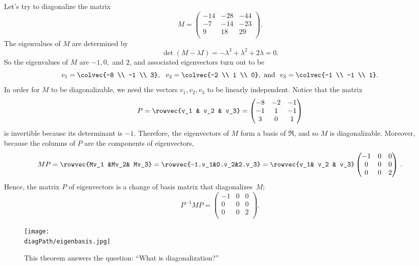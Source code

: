 \begin{example}
Let's try to diagonalize the matrix
\[M=\begin{pmatrix}
-14 & -28 & -44 \\
-7 & -14 & -23 \\
9 & 18 & 29 \\
\end{pmatrix}.\]
The eigenvalues of \(M\) are determined by \[\det(M-\lambda I)=-\lambda^3+\lambda^2+2\lambda=0.\]
So the eigenvalues of \(M\) are \(-1,0,\) and \(2\), and associated eigenvectors turn out to be 
\[
v_1=\colvec{-8 \\ -1 \\ 3},~~ v_2=\colvec{-2 \\ 1 \\ 0}, {\rm ~and~~} v_3=\colvec{-1 \\ -1 \\ 1}.
\] 
In order for \(M\) to be diagonalizable, we need the vectors \(v_1, v_2, v_3\) to be linearly independent. Notice that the matrix
\[P=\rowvec{v_1 & v_2 & v_3}=\begin{pmatrix}
-8 & -2 & -1 \\
-1 & 1 & -1 \\
3 & 0 & 1 \\
\end{pmatrix}\]
is invertible because its determinant is \(-1\). Therefore, the eigenvectors of \(M\) form a basis of \(\Re\), and so \(M\) is diagonalizable. 
Moreover, because the columns of $P$ are the components of eigenvectors, 
\[
MP=\rowvec{Mv_1 &Mv_2& Mv_3}=\rowvec{-1.v_1&0.v_2&2.v_3}=\rowvec{v_1& v_2 & v_3}\begin{pmatrix}
-1 & 0 & 0 \\
0 & 0 & 0 \\
0 & 0 & 2 \\
\end{pmatrix}\, .
\]
Hence, the matrix \(P\) of eigenvectors is a change of basis matrix that diagonalizes~\(M\);
\[P^{-1}MP=\begin{pmatrix}
-1 & 0 & 0 \\
0 & 0 & 0 \\
0 & 0 & 2 \\
\end{pmatrix}.\]
\end{example}


\begin{figure}
\begin{center}
\texttt{[image: \\diagPath/eigenbasis.jpg]}
\end{center}
\caption{This theorem answers the question: ``What is diagonalization?''}
\end{figure}

